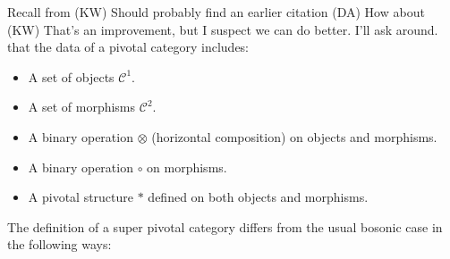 \documentclass[12pt,a4paper]{article}
\newcommand{\mcc}{\mathcal{C}}
\newcommand{\kw}[1]{{\color{kwcolor}\footnotesize{(KW) #1}}}
\newcommand{\dave}[1]{{\color{ao(english)}\footnotesize{(DA) #1}}}
\begin{document}
Recall from 
\cite{kitaev2006}
\kw{Should probably find an earlier citation}
\dave{How about \cite{Barrett1999}}
\kw{That's an improvement, but I suspect we can do better.  I'll ask around.}
that the data of a pivotal category includes:
\begin{itemize}
\item A set of objects $\mcc^1$.
\item A set of morphisms $\mcc^2$.
\item A binary operation $\otimes$ (horizontal composition) on objects and morphisms.
\item A binary operation $\circ$ on morphisms.
\item A pivotal structure $*$ defined on both objects and morphisms.
\end{itemize}


The definition of a super pivotal category differs from the usual bosonic case in the following ways:
\end{document}
